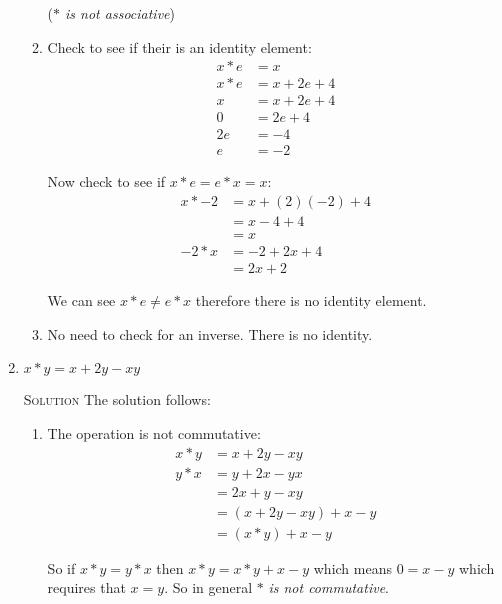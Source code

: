 \documentclass[twoside]{amsart}
\newcommand{\Solution}{\textsc{Solution}\xspace}
\newcommand{\brk}{\vspace{5pt}}
\begin{document}
\begin{enumerate}[label=\protect{\textbf{\arabic*}}, leftmargin=1em]
\begin{enumerate}[label=\protect{({\roman*})}]
    (\emph{$*$ is not associative}) \brk

  \item Check to see if their is an identity element:
    \begin{align*}
         x * e & = x           \\ 
         x * e & = x + 2e + 4  \\
	     x & = x + 2e + 4  \\
	     0 & =     2e + 4  \\
	    2e & =         -4  \\
	     e & =         -2  
    \end{align*}

    Now check to see if $x*e=e*x=x$:
    \begin{align*}
         x * -2 & = x + (2)(-2) + 4 \\
	        & = x - 4 + 4       \\
		& = x               \\
	 -2 * x & = -2 + 2x + 4     \\
	        & = 2x + 2          
    \end{align*}

    We can see $x*e \ne e*x$ therefore there is no identity
    element. \brk 

  \item No need to check for an inverse. There is no identity. \brk 
  \end{enumerate}

\item  $x * y = x + 2y - xy$

  \noindent \Solution The solution follows:

  \begin{enumerate}[label=\protect{(\roman*)}]
      
  \item The operation is not commutative:
    \begin{align*}
         x * y & = x + 2y - xy \\
	 y * x & = y + 2x - yx \\
	       & = 2x + y - xy \\
               & = (x + 2y - xy) + x - y \\
               & = (x * y) + x - y
    \end{align*}

    So if $x * y = y * x$ then $x * y = x * y + x - y$ which means $0 = x
    - y$ which requires that $x = y$. So in general $*$ \emph{is not
      commutative}. \brk


\end{enumerate}
\end{enumerate}
\end{document}
